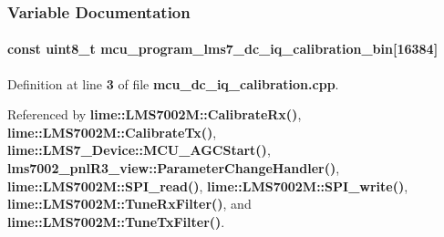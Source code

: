 \subsubsection{Variable Documentation}
\paragraph[{mcu\+\_\+program\+\_\+lms7\+\_\+dc\+\_\+iq\+\_\+calibration\+\_\+bin}]{ const uint8\+\_\+t mcu\+\_\+program\+\_\+lms7\+\_\+dc\+\_\+iq\+\_\+calibration\+\_\+bin[16384]}\label{mcu__programs_8h_af639473dcf5a5971adf0f0a401262ca2}


Definition at line {\bf 3} of file {\bf mcu\+\_\+dc\+\_\+iq\+\_\+calibration.\+cpp}.



Referenced by {\bf lime\+::\+L\+M\+S7002\+M\+::\+Calibrate\+Rx()}, {\bf lime\+::\+L\+M\+S7002\+M\+::\+Calibrate\+Tx()}, {\bf lime\+::\+L\+M\+S7\+\_\+\+Device\+::\+M\+C\+U\+\_\+\+A\+G\+C\+Start()}, {\bf lms7002\+\_\+pnl\+R3\+\_\+view\+::\+Parameter\+Change\+Handler()}, {\bf lime\+::\+L\+M\+S7002\+M\+::\+S\+P\+I\+\_\+read()}, {\bf lime\+::\+L\+M\+S7002\+M\+::\+S\+P\+I\+\_\+write()}, {\bf lime\+::\+L\+M\+S7002\+M\+::\+Tune\+Rx\+Filter()}, and {\bf lime\+::\+L\+M\+S7002\+M\+::\+Tune\+Tx\+Filter()}.

